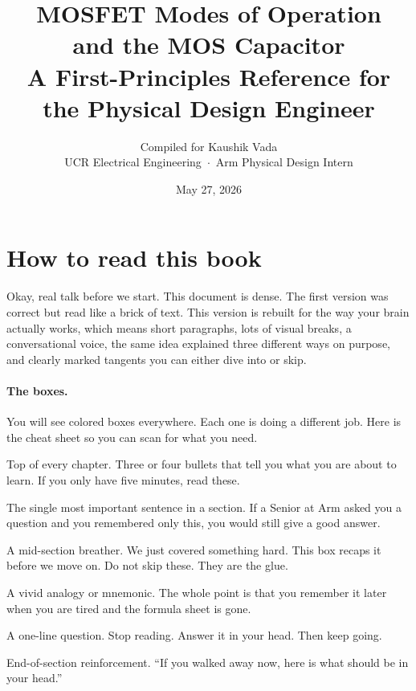 \documentclass[11pt]{article}
\title{\textbf{MOSFET Modes of Operation\\and the MOS Capacitor}\\[4pt]
\large A First-Principles Reference for the Physical Design Engineer}
\author{Compiled for Kaushik Vada\\\small UCR Electrical Engineering \,$\cdot$\, Arm Physical Design Intern}
\date{May 27, 2026}
\begin{document}
\maketitle

\section*{How to read this book}

Okay, real talk before we start. This document is dense. The first version was correct but read like a brick of text. This version is rebuilt for the way your brain actually works, which means short paragraphs, lots of visual breaks, a conversational voice, the same idea explained three different ways on purpose, and clearly marked tangents you can either dive into or skip.

\paragraph{The boxes.} You will see colored boxes everywhere. Each one is doing a different job. Here is the cheat sheet so you can scan for what you need.

\begin{tldr}
Top of every chapter. Three or four bullets that tell you what you are about to learn. If you only have five minutes, read these.
\end{tldr}

\begin{keyidea}
The single most important sentence in a section. If a Senior at Arm asked you a question and you remembered only this, you would still give a good answer.
\end{keyidea}

\begin{pause}
A mid-section breather. We just covered something hard. This box recaps it before we move on. Do not skip these. They are the glue.
\end{pause}

\begin{hook}
A vivid analogy or mnemonic. The whole point is that you remember it later when you are tired and the formula sheet is gone.
\end{hook}

\begin{gut}
A one-line question. Stop reading. Answer it in your head. Then keep going.
\end{gut}

\begin{checkpoint}
End-of-section reinforcement. ``If you walked away now, here is what should be in your head.''
\end{checkpoint}
\end{document}
